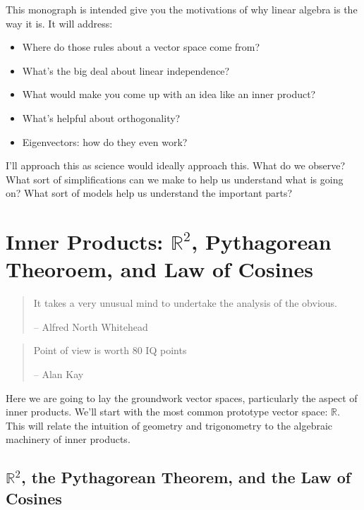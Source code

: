 \documentclass[
]{book}
\providecommand{\tightlist}{%
  \setlength{\itemsep}{0pt}\setlength{\parskip}{0pt}}
\begin{document}
This monograph is intended give you the motivations of why linear algebra is the way it is. It will address:

\begin{itemize}
\tightlist
\item
  Where do those rules about a vector space come from?
\item
  What's the big deal about linear independence?
\item
  What would make you come up with an idea like an inner product?
\item
  What's helpful about orthogonality?
\item
  Eigenvectors: how do they even work?
\end{itemize}

I'll approach this as science would ideally approach this. What do we observe? What sort of simplifications can we make to help us understand what is going on? What sort of models help us understand the important parts?

\hypertarget{inner-products-mathbbr2-pythagorean-theoroem-and-law-of-cosines}{%
\chapter{\texorpdfstring{Inner Products: \(\mathbb{R}^2\), Pythagorean Theoroem, and Law of Cosines}{Inner Products: \textbackslash mathbb\{R\}\^{}2, Pythagorean Theoroem, and Law of Cosines}}\label{inner-products-mathbbr2-pythagorean-theoroem-and-law-of-cosines}}

\begin{quote}
It takes a very unusual mind to undertake the analysis of the obvious.

-- Alfred North Whitehead
\end{quote}

\begin{quote}
Point of view is worth 80 IQ points

-- Alan Kay
\end{quote}

Here we are going to lay the groundwork vector spaces, particularly the aspect of inner products. We'll start with the most common prototype vector space: \(\mathbb{R}\). This will relate the intuition of geometry and trigonometry to the algebraic machinery of inner products.

\hypertarget{mathbbr2-the-pythagorean-theorem-and-the-law-of-cosines}{%
\section{\texorpdfstring{\(\mathbb{R}^2\), the Pythagorean Theorem, and the Law of Cosines}{\textbackslash mathbb\{R\}\^{}2, the Pythagorean Theorem, and the Law of Cosines}}\label{mathbbr2-the-pythagorean-theorem-and-the-law-of-cosines}}
\end{document}
